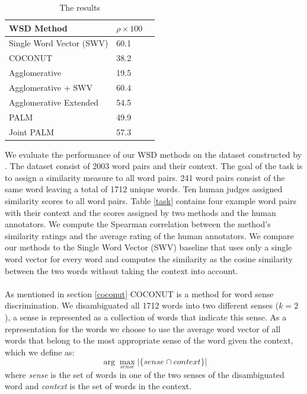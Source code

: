 \documentclass[11pt]{article}
\begin{document}
\begin{table}
\center
    \begin{tabular}{|l|l|l|}
    \hline
    \textbf{WSD Method} & $\rho \times 100$ \\ \hline
    Single Word Vector (SWV) & 60.1 \\ \hline
    COCONUT & 38.2 \\ \hline
    Agglomerative & 19.5 \\ \hline
    Agglomerative + SWV & 60.4 \\ \hline
    Agglomerative Extended & 54.5 \\ \hline
    PALM & 49.9 \\ \hline
    Joint PALM & 57.3 \\ \hline
    \end{tabular}
    \caption{The results}
    \label{results}
\end{table}
We evaluate the performance of our WSD methods on the dataset constructed by \cite{global}. The dataset consist of 2003 word pairs and their context. The goal of the task is to assign a similarity measure to all word pairs. 241 word pairs consist of the same word leaving a total of 1712 unique words. Ten human judges assigned similarity scores to all word pairs. Table \ref{task} contains four example word pairs with their context and the scores assigned by two methods and the human annotators. We compute the Spearman correlation between the method's similarity ratings and the average rating of the human annotators. We compare our methods to the Single Word Vector (SWV) baseline that uses only a single word vector for every word and computes the similarity as the cosine similarity between the two words without taking the context into account. \\\\
As mentioned in section \ref{coconut} COCONUT is a method for word sense discrimination. We disambiguated all 1712 words into two different senses ($k = 2$), a sense is represented as a collection of words that indicate this sense. As a representation for the words we choose to use the average word vector of all words that belong to the most appropriate sense of the word given the context, which we define as:
\begin{equation}\label{sense} \arg\max_{\textit{sense}}  | \{\textit{sense} \cap \textit{context}\} |\end{equation}
where \textit{sense} is the set of words in one of the two senses of the disambiguated word and \textit{context} is the set of words in the context.\\\\
\end{document}
